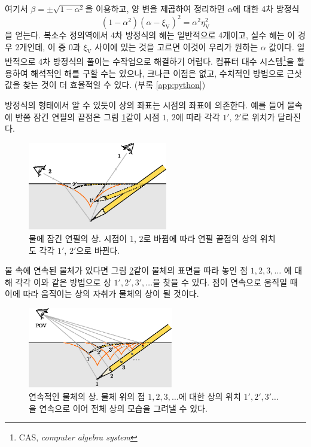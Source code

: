 \documentclass[twocolumn]{article}
\begin{document}
여기서 $\beta = \pm \sqrt{1-\alpha^2}$을 이용하고, 양 변을 제곱하여 정리하면 $\alpha$에 대한 4차 방정식
\[
\left( 1 - \alpha^2 \right) \left(\alpha-\xi_{\mathrm{V}} \right)^2 = \alpha^2 \eta_{\mathrm{V}}^2
\]
을 얻는다. 복소수 정의역에서 4차 방정식의 해는 일반적으로 4개이고, 실수 해는 이 경우 2개인데, 이 중 $0$과 $\xi_{\mathrm{V}}$ 사이에 있는 것을 고르면 이것이 우리가 원하는 $\alpha$ 값이다. 일반적으로 4차 방정식의 풀이는 수작업으로 해결하기 어렵다. 컴퓨터 대수 시스템\footnote{CAS, \emph{computer algebra system}}을 활용하여 해석적인 해를 구할 수는 있으나, 크나큰 이점은 없고, 수치적인 방법으로 근삿값을 찾는 것이 더 효율적일 수 있다. (부록 \ref{app:python})

방정식의 형태에서 알 수 있듯이 상의 좌표는 시점의 좌표에 의존한다. 예를 들어 물속에 반쯤 잠긴 연필의 끝점은 그림 \ref{fig:pencil_view}\와 같이 시점 $1$, $2$에 따라 각각 $1'$, $2'$로 위치가 달라진다.

\begin{figure}[h]
	\centering
	\includegraphics[width=2.4in]{figs/g43.eps}
	\caption{물에 잠긴 연필의 상. 시점이 $1$, $2$로 바뀜에 따라 연필 끝점의 상의 위치도 각각 $1'$, $2'$으로 바뀐다.}
	\label{fig:pencil_view}
\end{figure}

물 속에 연속된 물체가 있다면 그림 \ref{fig:extended_image}\와 같이 물체의 표면을 따라 놓인 점 $1, 2, 3, \dots$ 에 대해
각각 이와 같은 방법으로 상 $1', 2', 3', \dots$을 찾을 수 있다. 점이 연속으로 움직일 때 이에 따라 움직이는 상의 자취가 
물체의 상이 될 것이다.

\begin{figure}[h]
	\centering
	\includegraphics*[width=2.5in]{figs/g242.eps}
	\caption{연속적인 물체의 상. 물체 위의 점 $1, 2, 3, \dots$에 대한 상의 위치 $1', 2', 3' \dots$을 연속으로 이어 전체 상의 모습을 그려낼 수 있다.}
	\label{fig:extended_image}
\end{figure}
\end{document}
